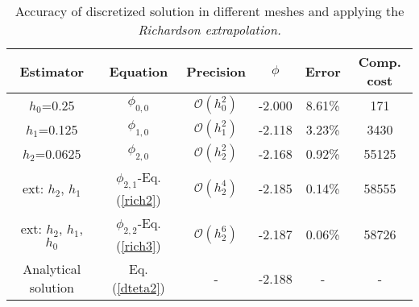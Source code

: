 \begin{table}[htb!]
    \centering
    \begin{tabular}{c c c c c c}
        \hline
        Estimator &  Equation  &Precision&$\phi$&Error& Comp. cost\\
        \hline
        $h_0$=0.25 & $\phi_{0,0}$ &$\mathcal{O}(h_0^2)$&-2.000& 8.61\%&171 \\
        $h_1$=0.125& $\phi_{1,0}$&$\mathcal{O}(h_1^2)$&-2.118& 3.23\%&3430\\
        $h_2$=0.0625 & $\phi_{2,0}$&$\mathcal{O}(h_2^2)$&-2.168& 0.92\%&55125 \\
        ext: $h_2$, $h_1$ &  $\phi_{2,1}$-Eq. (\ref{rich2}) &$\mathcal{O}(h_2^4)$& -2.185& 0.14\%&58555 \\
        ext: $h_2$, $h_1$, $h_0$ & $\phi_{2,2}$-Eq. (\ref{rich3}) &$\mathcal{O}(h_2^6)$& -2.187& 0.06\%& 58726\\
        Analytical solution &  Eq. (\ref{dteta2}) &- &-2.188&-&-\\
        \hline
    \end{tabular}
    \caption{Accuracy of discretized solution in different meshes and applying the \textit{Richardson extrapolation.}}
    \label{tab:my_label}
\end{table}




